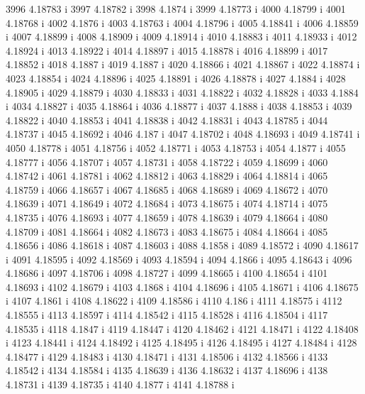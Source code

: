  3996  4.18783  i
 3997  4.18782  i
 3998  4.1874  i
 3999  4.18773  i
 4000  4.18799  i
 4001  4.18768  i
 4002  4.1876  i
 4003  4.18763  i
 4004  4.18796  i
 4005  4.18841  i
 4006  4.18859  i
 4007  4.18899  i
 4008  4.18909  i
 4009  4.18914  i
 4010  4.18883  i
 4011  4.18933  i
 4012  4.18924  i
 4013  4.18922  i
 4014  4.18897  i
 4015  4.18878  i
 4016  4.18899  i
 4017  4.18852  i
 4018  4.1887  i
 4019  4.1887  i
 4020  4.18866  i
 4021  4.18867  i
 4022  4.18874  i
 4023  4.18854  i
 4024  4.18896  i
 4025  4.18891  i
 4026  4.18878  i
 4027  4.1884  i
 4028  4.18905  i
 4029  4.18879  i
 4030  4.18833  i
 4031  4.18822  i
 4032  4.18828  i
 4033  4.1884  i
 4034  4.18827  i
 4035  4.18864  i
 4036  4.18877  i
 4037  4.1888  i
 4038  4.18853  i
 4039  4.18822  i
 4040  4.18853  i
 4041  4.18838  i
 4042  4.18831  i
 4043  4.18785  i
 4044  4.18737  i
 4045  4.18692  i
 4046  4.187  i
 4047  4.18702  i
 4048  4.18693  i
 4049  4.18741  i
 4050  4.18778  i
 4051  4.18756  i
 4052  4.18771  i
 4053  4.18753  i
 4054  4.1877  i
 4055  4.18777  i
 4056  4.18707  i
 4057  4.18731  i
 4058  4.18722  i
 4059  4.18699  i
 4060  4.18742  i
 4061  4.18781  i
 4062  4.18812  i
 4063  4.18829  i
 4064  4.18814  i
 4065  4.18759  i
 4066  4.18657  i
 4067  4.18685  i
 4068  4.18689  i
 4069  4.18672  i
 4070  4.18639  i
 4071  4.18649  i
 4072  4.18684  i
 4073  4.18675  i
 4074  4.18714  i
 4075  4.18735  i
 4076  4.18693  i
 4077  4.18659  i
 4078  4.18639  i
 4079  4.18664  i
 4080  4.18709  i
 4081  4.18664  i
 4082  4.18673  i
 4083  4.18675  i
 4084  4.18664  i
 4085  4.18656  i
 4086  4.18618  i
 4087  4.18603  i
 4088  4.1858  i
 4089  4.18572  i
 4090  4.18617  i
 4091  4.18595  i
 4092  4.18569  i
 4093  4.18594  i
 4094  4.1866  i
 4095  4.18643  i
 4096  4.18686  i
 4097  4.18706  i
 4098  4.18727  i
 4099  4.18665  i
 4100  4.18654  i
 4101  4.18693  i
 4102  4.18679  i
 4103  4.1868  i
 4104  4.18696  i
 4105  4.18671  i
 4106  4.18675  i
 4107  4.1861  i
 4108  4.18622  i
 4109  4.18586  i
 4110  4.186  i
 4111  4.18575  i
 4112  4.18555  i
 4113  4.18597  i
 4114  4.18542  i
 4115  4.18528  i
 4116  4.18504  i
 4117  4.18535  i
 4118  4.1847  i
 4119  4.18447  i
 4120  4.18462  i
 4121  4.18471  i
 4122  4.18408  i
 4123  4.18441  i
 4124  4.18492  i
 4125  4.18495  i
 4126  4.18495  i
 4127  4.18484  i
 4128  4.18477  i
 4129  4.18483  i
 4130  4.18471  i
 4131  4.18506  i
 4132  4.18566  i
 4133  4.18542  i
 4134  4.18584  i
 4135  4.18639  i
 4136  4.18632  i
 4137  4.18696  i
 4138  4.18731  i
 4139  4.18735  i
 4140  4.1877  i
 4141  4.18788  i
